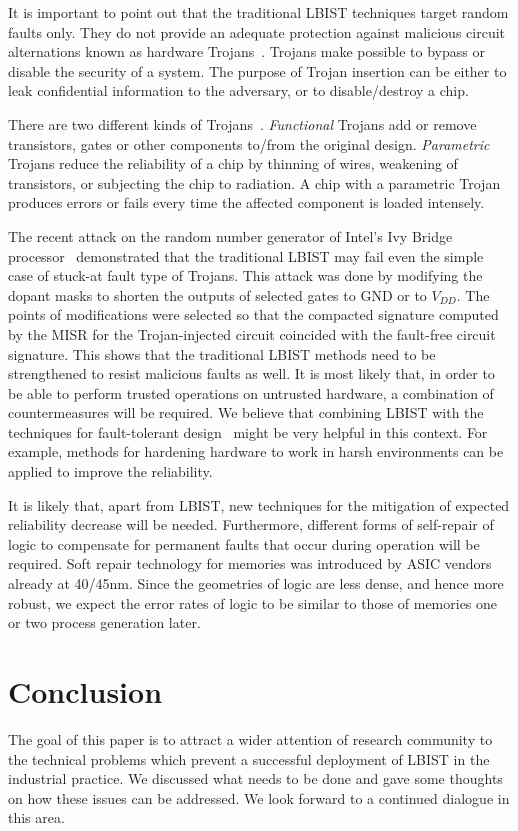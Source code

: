 \documentclass[conference]{IEEEtran}
\begin{document}
It is important to point out that the traditional LBIST techniques target random faults only. 
They do not provide an adequate protection against malicious circuit alternations known as hardware Trojans~\cite{TeK10}. Trojans make possible to bypass or disable the security of a system. The purpose of Trojan insertion can be either to leak confidential information to the adversary, or to disable/destroy a chip. 

There are two different kinds of Trojans~\cite{TeK10}. 
{\em Functional} Trojans add or remove transistors, gates or other components to/from the original design.
{\em Parametric} Trojans reduce the reliability of a chip by thinning of wires, weakening of transistors, or subjecting the chip to radiation. A chip with a parametric Trojan produces errors or fails every time the affected component is loaded intensely.
 
The recent attack on the random number generator of Intel's Ivy Bridge processor~\cite{BeRPB13} demonstrated that the traditional LBIST
may fail even the simple case of stuck-at fault type of Trojans.
This attack was done by modifying the dopant masks to shorten the outputs of selected gates to GND or to $V_{DD}$. The points of modifications were selected so that the compacted signature computed by the MISR for the Trojan-injected circuit coincided with the fault-free circuit signature.  This shows that the traditional LBIST methods need to be strengthened to resist malicious faults as well. 
It is most likely that, in order to be able to perform trusted operations on untrusted hardware, a combination of countermeasures will be required. 
We believe that combining LBIST with the techniques for fault-tolerant design~\cite{Du13book} might be very helpful in this context.
For example, methods for hardening hardware to work in harsh environments can be applied to improve the reliability.

It is likely that, apart from LBIST, new techniques for the mitigation of expected reliability decrease
will be needed. Furthermore, different forms of self-repair of logic to compensate for permanent 
faults that occur during operation will be required. Soft repair technology for memories was introduced by ASIC vendors already at 40/45nm.
Since the geometries of logic are less dense, and hence 
more robust, we expect the error rates of logic to be similar to those of memories one or two process 
generation later.

\section{Conclusion} \label{con}
 
The goal of this paper is to attract a wider attention of research community to the technical 
problems which prevent a successful deployment of LBIST in the industrial practice.
We discussed what needs to be done and gave some thoughts on how these issues can be addressed.
We look forward to a continued dialogue in this area.



\balance


\end{document}
